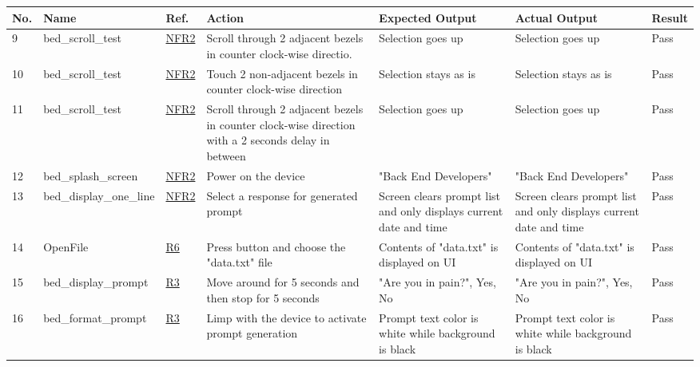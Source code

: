 \documentclass[12pt, titlepage]{article}
\begin{document}
\begin{center}
\begin{table} [H]
\begin{tabular}{ | p{0.5cm} | p{2.8cm} |  p{1.1cm} | p{2.7cm} | p{2.7cm} | p{2.7cm} | p{1.1cm} |}
\hline
\textbf{No.} & \textbf{Name}  & \textbf{Ref.} & \textbf{Action} & \textbf{Expected Output} & \textbf{Actual \newline Output} & \textbf{Result} \\
\hline
9 & bed\_scroll\_test &  \href{https://github.com/zakerl/Capstone_Project/blob/main/docs/SRS/SRS.pdf}{NFR2} & Scroll through 2 adjacent bezels in counter clock-wise directio. & Selection goes up & Selection goes up & Pass \\ 
\hline
10 & bed\_scroll\_test &  \href{https://github.com/zakerl/Capstone_Project/blob/main/docs/SRS/SRS.pdf}{NFR2} & Touch 2 non-adjacent bezels in counter clock-wise direction & Selection stays as is & Selection stays as is & Pass \\ 
\hline
11 & bed\_scroll\_test &  \href{https://github.com/zakerl/Capstone_Project/blob/main/docs/SRS/SRS.pdf}{NFR2} & Scroll through 2 adjacent bezels in counter clock-wise direction with a 2 seconds delay in between & Selection goes up & Selection goes up & Pass \\ 
\hline
12 & bed\_splash\newline \_screen & \href{https://github.com/zakerl/Capstone_Project/blob/main/docs/SRS/SRS.pdf}{NFR2} & Power on the device & "Back End Developers" & "Back End Developers" & Pass \\ 
\hline
13 & bed\_display\newline \_one\_line & \href{https://github.com/zakerl/Capstone_Project/blob/main/docs/SRS/SRS.pdf}{NFR2} & Select a response for generated prompt & Screen clears prompt list and only displays current date and time & Screen clears prompt list and only displays current date and time & Pass \\ 
\hline
14 & OpenFile & \href{https://github.com/zakerl/Capstone_Project/blob/main/docs/SRS/SRS.pdf}{R6} & Press button and choose the "data.txt" file & Contents of "data.txt" is displayed on UI & Contents of "data.txt" is displayed on UI  & Pass \\ 
\hline
15 & bed\_display\newline \_prompt & \href{https://github.com/zakerl/Capstone_Project/blob/main/docs/SRS/SRS.pdf}{R3} & Move around for 5 seconds and then stop for 5 seconds & "Are you in pain?", Yes, No & "Are you in pain?", Yes, No & Pass \\ 
\hline
16 & bed\_format\newline \_prompt & \href{https://github.com/zakerl/Capstone_Project/blob/main/docs/SRS/SRS.pdf}{R3} & Limp with the device to activate prompt generation & Prompt text color is white while background is black & Prompt text color is white while background is black  & Pass \\ 
\hline
\end{tabular}
\end{table}
\end{center}
\end{document}
